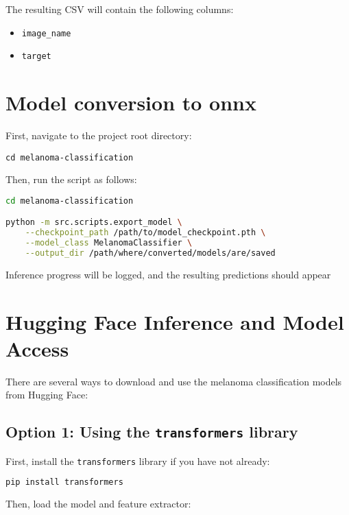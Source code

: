 The resulting CSV will contain the following columns:
\begin{itemize}
    \item \texttt{image\_name}
    \item \texttt{target}
\end{itemize}


\section{ Model conversion  to onnx}
First, navigate to the project root directory:

\begin{verbatim}
cd melanoma-classification
\end{verbatim}

Then, run the script as follows:

\begin{lstlisting}[language=bash, caption={Convert model checkpoint to ONNX/TorchScript}, label={lst:model_export}]
cd melanoma-classification

python -m src.scripts.export_model \
    --checkpoint_path /path/to/model_checkpoint.pth \
    --model_class MelanomaClassifier \
    --output_dir /path/where/converted/models/are/saved
\end{lstlisting}


Inference progress will be logged, and the resulting predictions should appear


\section{Hugging Face Inference and Model Access}

There are several ways to download and use the melanoma classification models from Hugging Face:

\subsection{Option 1: Using the \texttt{transformers} library}

First, install the \texttt{transformers} library if you have not already:

\begin{lstlisting}[language=bash, caption={Install Hugging Face Transformers}, label={lst:install_transformers}]
pip install transformers
\end{lstlisting}

Then, load the model and feature extractor:

